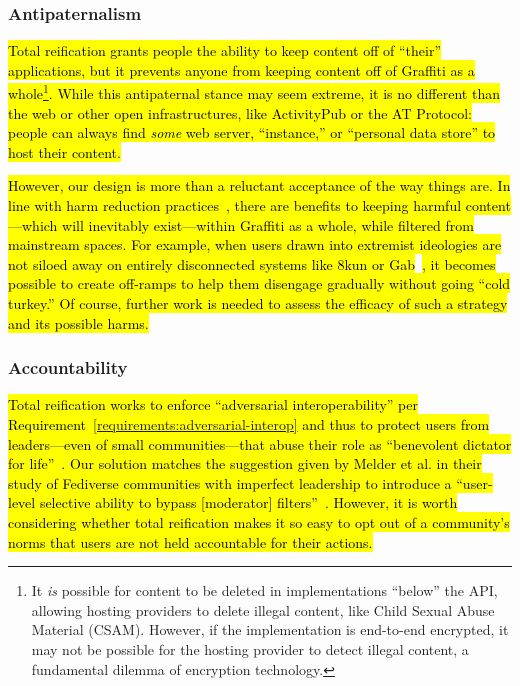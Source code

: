 \subsubsection{Antipaternalism}

\hl{%
Total reification grants people the ability to keep content off of ``their'' applications,
but it prevents anyone from keeping content off of Graffiti as a whole\footnote{%
It \emph{is} possible for content to be deleted in implementations ``below'' the API,
allowing hosting providers to delete illegal content,
like Child Sexual Abuse Material (CSAM).
However, if the implementation is end-to-end encrypted,
it may not be possible for the hosting provider to
detect illegal content,
a fundamental dilemma of encryption technology.
}.
While this antipaternal stance may seem extreme,
it is no different than the web or other open infrastructures,
like ActivityPub or the AT Protocol:
people can always find \emph{some}
web server, ``instance,''
or ``personal data store'' to host their content.
}%

\hl{%
However, our design is more than a reluctant acceptance of the way things are.
In line with harm reduction practices~\expandafter{\expandafter\cite{harmreduction}},
there are benefits to keeping harmful content---which will inevitably
exist---within Graffiti as a whole, while filtered from mainstream spaces.
For example, when users drawn into extremist ideologies are not
siloed away on entirely disconnected systems
like 8kun or Gab}~\cite{8kun,gab}\hl{, it becomes possible to create off-ramps
to help them disengage gradually without going ``cold turkey.''
Of course, further work is needed to assess the efficacy of
such a strategy and its possible harms.
}%

\subsubsection{Accountability}

\hl{%
Total reification works to enforce ``adversarial interoperability''
per Requirement~{\ref{requirements:adversarial-interop}}
and thus to protect users from leaders---even of small communities---that abuse their role as
``benevolent dictator for life''~{\cite{governablespaces}}.
Our solution matches the suggestion given by Melder et al.
in their study of Fediverse communities with imperfect leadership
to introduce a ``user-level selective ability to bypass [moderator] filters''~{\cite{blocklistboundary}}.
However, it is worth considering whether total reification makes it so easy
to opt out of a community's norms that users are not held accountable for their actions.
}%

